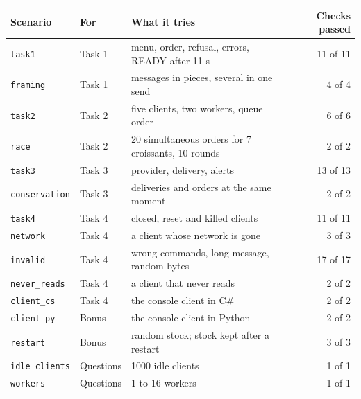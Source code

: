 \begin{tabular}{lllr}
\toprule
Scenario & For & What it tries & Checks passed \\
\midrule
\texttt{task1} & Task 1 & menu, order, refusal, errors, READY after 11 s & 11 of 11 \\
\texttt{framing} & Task 1 & messages in pieces, several in one send & 4 of 4 \\
\texttt{task2} & Task 2 & five clients, two workers, queue order & 6 of 6 \\
\texttt{race} & Task 2 & 20 simultaneous orders for 7 croissants, 10 rounds & 2 of 2 \\
\texttt{task3} & Task 3 & provider, delivery, alerts & 13 of 13 \\
\texttt{conservation} & Task 3 & deliveries and orders at the same moment & 2 of 2 \\
\texttt{task4} & Task 4 & closed, reset and killed clients & 11 of 11 \\
\texttt{network} & Task 4 & a client whose network is gone & 3 of 3 \\
\texttt{invalid} & Task 4 & wrong commands, long message, random bytes & 17 of 17 \\
\texttt{never\_reads} & Task 4 & a client that never reads & 2 of 2 \\
\texttt{client\_cs} & Task 4 & the console client in C\# & 2 of 2 \\
\texttt{client\_py} & Bonus & the console client in Python & 2 of 2 \\
\texttt{restart} & Bonus & random stock; stock kept after a restart & 3 of 3 \\
\texttt{idle\_clients} & Questions & 1000 idle clients & 1 of 1 \\
\texttt{workers} & Questions & 1 to 16 workers & 1 of 1 \\
\bottomrule
\end{tabular}
